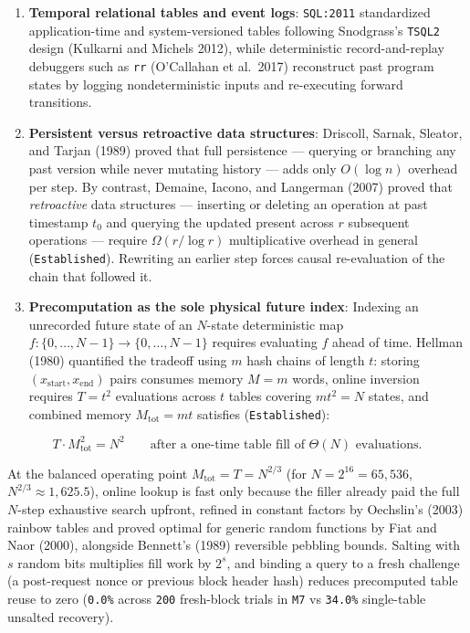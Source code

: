 \documentclass[10pt,letterpaper]{article}
\providecommand{\tightlist}{\setlength{\itemsep}{1pt}\setlength{\parskip}{0pt}}
\begin{document}
\begin{enumerate}
\def\labelenumi{\arabic{enumi}.}
\tightlist
\item
  \textbf{Temporal relational tables and event logs}: \texttt{SQL:2011}
  standardized application-time and system-versioned tables following
  Snodgrass's \texttt{TSQL2} design (Kulkarni and Michels 2012), while
  deterministic record-and-replay debuggers such as \texttt{rr}
  (O'Callahan et al.~2017) reconstruct past program states by logging
  nondeterministic inputs and re-executing forward transitions.
\item
  \textbf{Persistent versus retroactive data structures}: Driscoll,
  Sarnak, Sleator, and Tarjan (1989) proved that full persistence ---
  querying or branching any past version while never mutating history
  --- adds only \(O(\log n)\) overhead per step. By contrast, Demaine,
  Iacono, and Langerman (2007) proved that \emph{retroactive} data
  structures --- inserting or deleting an operation at past timestamp
  \(t_0\) and querying the updated present across \(r\) subsequent
  operations --- require \(\Omega(r / \log r)\) multiplicative overhead
  in general (\texttt{Established}). Rewriting an earlier step forces
  causal re-evaluation of the chain that followed it.
\item
  \textbf{Precomputation as the sole physical future index}: Indexing an
  unrecorded future state of an \(N\)-state deterministic map
  \(f : \{0,\dots,N-1\} \to \{0,\dots,N-1\}\) requires evaluating \(f\)
  ahead of time. Hellman (1980) quantified the tradeoff using \(m\) hash
  chains of length \(t\): storing \((x_{\text{start}}, x_{\text{end}})\)
  pairs consumes memory \(M = m\) words, online inversion requires
  \(T = t^2\) evaluations across \(t\) tables covering \(m t^2 = N\)
  states, and combined memory \(M_{\text{tot}} = m t\) satisfies
  (\texttt{Established}):
\end{enumerate}

\[T \cdot M_{\text{tot}}^2 = N^2 \qquad \text{after a one-time table fill of } \Theta(N) \text{ evaluations.}\]

At the balanced operating point \(M_{\text{tot}} = T = N^{2/3}\) (for
\(N = 2^{16} = 65{,}536\), \(N^{2/3} \approx 1{,}625.5\)), online lookup
is fast only because the filler already paid the full \(N\)-step
exhaustive search upfront, refined in constant factors by Oechslin's
(2003) rainbow tables and proved optimal for generic random functions by
Fiat and Naor (2000), alongside Bennett's (1989) reversible pebbling
bounds. Salting with \(s\) random bits multiplies fill work by \(2^s\),
and binding a query to a fresh challenge (a post-request nonce or
previous block header hash) reduces precomputed table reuse to zero
(\texttt{0.0\%} across \texttt{200} fresh-block trials in \texttt{M7} vs
\texttt{34.0\%} single-table unsalted recovery).
\end{document}
